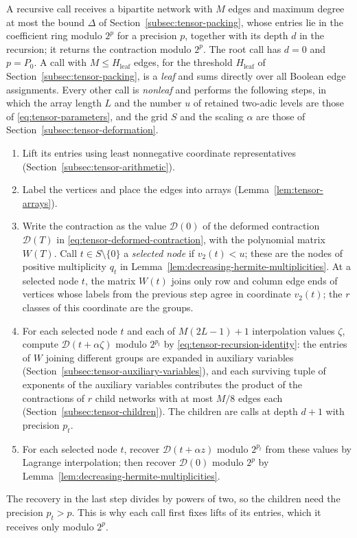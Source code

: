 A recursive call receives a bipartite network with $M$ edges and
maximum degree at most the bound $\Delta$ of
Section~\ref{subsec:tensor-packing}, whose entries lie in
the coefficient ring modulo $2^p$ for a precision $p$, together with its depth $d$ in the
recursion; it returns the contraction modulo $2^p$. The root call
has $d=0$ and $p=P_0$. A call with $M\le H_{\mathrm{leaf}}$ edges, for the threshold
$H_{\mathrm{leaf}}$ of Section~\ref{subsec:tensor-packing}, is a \emph{leaf} and sums
directly over all Boolean edge assignments. Every other call is
\emph{nonleaf} and performs the following steps, in which the array
length $L$ and the number $u$ of retained two-adic levels are those of
\eqref{eq:tensor-parameters}, and the grid $S$ and the scaling
$\alpha$ are those of Section~\ref{subsec:tensor-deformation}.
\begin{enumerate}
\item Lift its entries using least nonnegative coordinate representatives
      (Section~\ref{subsec:tensor-arithmetic}).
\item Label the vertices and place the edges into arrays
      (Lemma~\ref{lem:tensor-arrays}).
\item Write the contraction as the value $\mathcal D(0)$ of the deformed
      contraction $\mathcal D(T)$ in \eqref{eq:tensor-deformed-contraction},
      with the polynomial matrix $W(T)$. Call $t\in S\setminus\{0\}$ a
      \emph{selected node} if $v_2(t)<u$; these are the nodes of positive
      multiplicity $q_t$ in Lemma~\ref{lem:decreasing-hermite-multiplicities}. At a
      selected node $t$, the matrix $W(t)$ joins only row and column
      edge ends of vertices whose labels from the previous step agree in
      coordinate $v_2(t)$; the $r$ classes of this coordinate are the
      groups.
\item For each selected node $t$ and each of $M(2L-1)+1$ interpolation
      values $\zeta$, compute $\mathcal D(t+\alpha\zeta)$ modulo $2^{p_t}$ by
      \eqref{eq:tensor-recursion-identity}: the entries of $W$ joining
      different groups are expanded in auxiliary variables
      (Section~\ref{subsec:tensor-auxiliary-variables}), and each surviving tuple of
      exponents of the auxiliary variables contributes the product of the contractions of
      $r$ child networks with at most $M/8$ edges each
      (Section~\ref{subsec:tensor-children}). The children are calls
      at depth $d+1$ with precision $p_t$.
\item For each selected node $t$, recover $\mathcal D(t+\alpha z)$ modulo
      $2^{p_t}$ from these values by Lagrange interpolation; then
      recover $\mathcal D(0)$ modulo $2^p$ by Lemma~\ref{lem:decreasing-hermite-multiplicities}.
\end{enumerate}
The recovery in the last step divides by powers of two, so the
children need the precision $p_t>p$. This is why each call first
fixes lifts of its entries, which it receives only modulo $2^p$.

